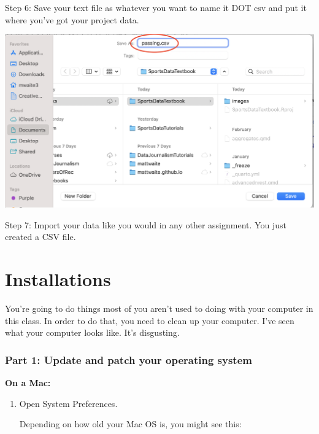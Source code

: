 \documentclass[
  letterpaper,
  DIV=11,
  numbers=noendperiod]{scrreprt}
\begin{document}
Step 6: Save your text file as whatever you want to name it DOT csv and
put it where you've got your project data.

\includegraphics[width=1\textwidth,height=\textheight]{./images/csv6.png}

Step 7: Import your data like you would in any other assignment. You
just created a CSV file.


\hypertarget{installations}{%
\chapter{Installations}\label{installations}}

You're going to do things most of you aren't used to doing with your
computer in this class. In order to do that, you need to clean up your
computer. I've seen what your computer looks like. It's disgusting.

\hypertarget{part-1-update-and-patch-your-operating-system}{%
\subsection{Part 1: Update and patch your operating
system}\label{part-1-update-and-patch-your-operating-system}}

\textbf{On a Mac:}

\begin{enumerate}
\def\labelenumi{\arabic{enumi}.}
\item
  Open System Preferences.

  Depending on how old your Mac OS is, you might see this:
\end{enumerate}
\end{document}
